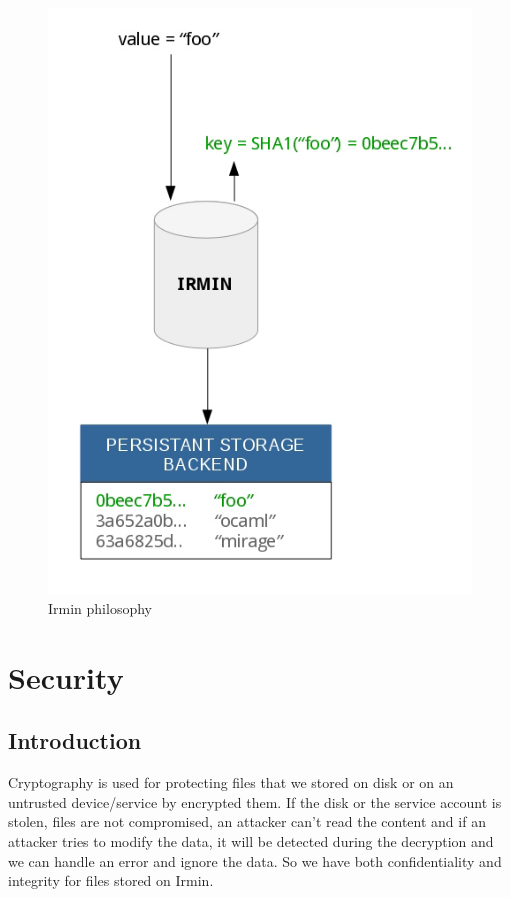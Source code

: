 \documentclass[10pt,a4paper]{report}
\begin{document}
\begin{figure}[H]
\centerline{\includegraphics[scale=0.5]{img/key-value-irmin.jpg}}
\caption{Irmin philosophy}
\end{figure}

\chapter{Security}

\section{Introduction}

Cryptography is used for protecting files that we stored on disk or on an untrusted device/service by encrypted them. If the disk or the service account is stolen, files are not compromised, an attacker
can't read the content and if an attacker tries to modify the data, it will be detected during the decryption and we can handle an error and ignore the data. So we have both confidentiality and integrity for
files stored on Irmin.  \newline
\end{document}

